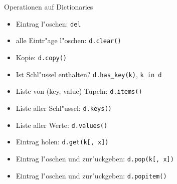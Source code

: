 \begin{frame}[fragile]{Operationen auf Dictionaries}
\begin{itemize}
\item Eintrag l"oschen: \lstinline{del}
\item alle Eintr"age l"oschen: \lstinline{d.clear()}
\item Kopie: \lstinline{d.copy()}
\item Ist Schl"ussel enthalten? \lstinline{d.has_key(k)}, \lstinline{k in d}
\item Liste von (key, value)-Tupeln: \lstinline{d.items()}
\item Liste aller Schl"ussel: \lstinline{d.keys()}
\item Liste aller Werte: \lstinline{d.values()}
\item Eintrag holen: \lstinline{d.get(k[, x])}
\item Eintrag l"oschen und zur"uckgeben: \lstinline{d.pop(k[, x])}
\item Eintrag l"oschen und zur"uckgeben:  \lstinline{d.popitem()}
\end{itemize}
\end{frame}



